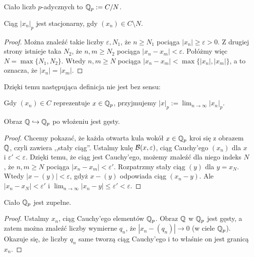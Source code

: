 \begin{definicja}
	Ciało liczb $p$-adycznych to $\mathbb Q_p := C / N$.
\end{definicja}

\begin{lemat}
	Ciąg $|x_n|_p$ jest stacjonarny, gdy $(x_n) \in C \setminus N$.
\end{lemat}

\begin{proof}
	Można znaleźć takie liczby $\varepsilon, N_1$, że $n \ge N_1$ pociąga $|x_n| \ge \varepsilon > 0$.
	Z drugiej strony istnieje taka $N_2$, że $n, m \ge N_2$ pociąga $|x_n - x_m| < \varepsilon$.
	Połóżmy więc $N = \max\{N_1, N_2\}$.
	Wtedy $n, m \ge N$ pociąga $|x_n - x_m| < \max\{|x_n|, |x_m|\}$, a to oznacza, że $|x_n| = |x_m|$.
\end{proof}

Dzięki temu następująca definicja nie jest bez sensu:

\begin{definicja}
	Gdy $(x_n) \in C$ reprezentuje $x \in \mathbb Q_p$, przyjmujemy $|x|_p := \lim_{n \to \infty} |x_n|_p$.
\end{definicja}

\begin{lemat}
	Obraz $\mathbb Q \hookrightarrow \mathbb Q_p$ po włożeniu jest gęsty.
\end{lemat}

\begin{proof}
	Chcemy pokazać, że każda otwarta kula wokół $x \in \mathbb Q_p$ kroi się z obrazem $\mathbb Q$, czyli zawiera ,,stały ciąg''.
	Ustalmy kulę $\mathcal B(x, \varepsilon)$, ciąg Cauchy'ego $(x_n)$ dla $x$ i $\varepsilon' < \varepsilon$.
	Dzięki temu, że ciąg jest Cauchy'ego, możemy znaleźć dla niego indeks $N$, że $n, m \ge N$ pociąga $|x_n - x_m| < \varepsilon'$.
	Rozpatrzmy stały ciąg $(y)$ dla $y = x_N$.
	Wtedy $|x - (y)| < \varepsilon$, gdyż $x - (y)$ odpowiada ciąg $(x_n-y)$.
	Ale $|x_n - x_N| < \varepsilon'$ i $\lim_{n \to \infty}|x_n - y| \le \varepsilon' < \varepsilon$.
\end{proof}

\begin{fakt}
	Ciało $\mathbb Q_p$ jest zupełne.
\end{fakt}

\begin{proof} 
	Ustalmy $x_n$, ciąg Cauchy'ego elementów $\mathbb Q_p$.
	Obraz $\mathbb Q$ w $\mathbb Q_p$ jest gęsty, a zatem można znaleźć liczby wymierne $q_n$, że $|x_n - (q_n)| \to 0$ (w ciele $\mathbb Q_p$).
	Okazuje się, że liczby $q_n$ same tworzą ciąg Cauchy'ego i to właśnie on jest granicą $x_n$.
\end{proof}

